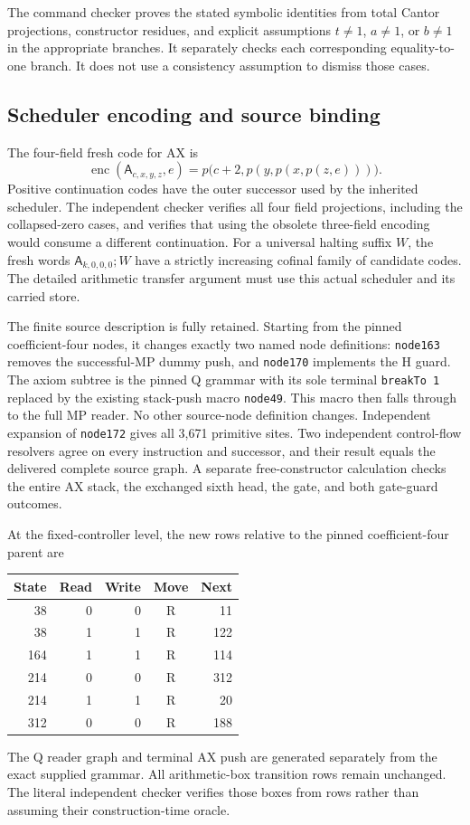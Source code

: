 The command checker proves the stated symbolic identities from total
Cantor projections, constructor residues, and explicit assumptions
$t\ne1$, $a\ne1$, or $b\ne1$ in the appropriate branches. It separately
checks each corresponding equality-to-one branch. It does not use a
consistency assumption to dismiss those cases.

\subsection{Scheduler encoding and source binding}

The four-field fresh code for AX is
\[
 \operatorname{enc}(\mathsf A_{c,x,y,z},e)
       =p\bigl(c+2,p(y,p(x,p(z,e)))\bigr).
\]
Positive continuation codes have the outer successor used by the
inherited scheduler. The independent checker verifies all four field
projections, including the collapsed-zero cases, and verifies that using
the obsolete three-field encoding would consume a different continuation.
For a universal halting suffix $W$, the fresh words
$\mathsf A_{k,0,0,0};W$ have a strictly increasing cofinal family of
candidate codes. The detailed arithmetic transfer argument must use
this actual scheduler and its carried store.

The finite source description is fully retained. Starting from the
pinned coefficient-four nodes, it changes exactly two named node
definitions: \texttt{node163} removes the successful-MP dummy push,
and \texttt{node170} implements the H guard. The axiom subtree is the
pinned Q grammar with its sole terminal \texttt{breakTo 1} replaced by
the existing stack-push macro \texttt{node49}. This macro then falls
through to the full MP reader. No other source-node definition changes.
Independent expansion of \texttt{node172} gives all 3,671 primitive sites.
Two independent control-flow resolvers agree on every instruction and
successor, and their result equals the delivered complete source graph.
A separate free-constructor calculation checks the entire AX stack,
the exchanged sixth head, the gate, and both gate-guard outcomes.

At the fixed-controller level, the new rows relative to the pinned
coefficient-four parent are
\begin{center}
\begin{tabular}{rrrcr}
\toprule
State & Read & Write & Move & Next\\
\midrule
38&0&0&R&11\\
38&1&1&R&122\\
164&1&1&R&114\\
214&0&0&R&312\\
214&1&1&R&20\\
312&0&0&R&188\\
\bottomrule
\end{tabular}
\end{center}
The Q reader graph and terminal AX push are generated separately from
the exact supplied grammar. All arithmetic-box transition rows remain
unchanged. The literal independent checker verifies those boxes from
rows rather than assuming their construction-time oracle.

